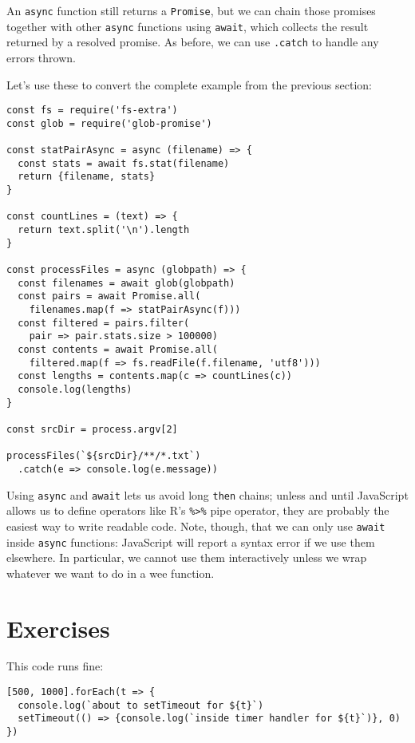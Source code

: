 An \texttt{async} function still returns a \texttt{Promise},
but we can chain those promises together with other \texttt{async} functions using \texttt{await},
which collects the result returned by a resolved promise.
As before, we can use \texttt{.catch} to handle any errors thrown.

Let's use these to convert the complete example from the previous section:

\begin{verbatim}
const fs = require('fs-extra')
const glob = require('glob-promise')

const statPairAsync = async (filename) => {
  const stats = await fs.stat(filename)
  return {filename, stats}
}

const countLines = (text) => {
  return text.split('\n').length
}

const processFiles = async (globpath) => {
  const filenames = await glob(globpath)
  const pairs = await Promise.all(
    filenames.map(f => statPairAsync(f)))
  const filtered = pairs.filter(
    pair => pair.stats.size > 100000)
  const contents = await Promise.all(
    filtered.map(f => fs.readFile(f.filename, 'utf8')))
  const lengths = contents.map(c => countLines(c))
  console.log(lengths)
}

const srcDir = process.argv[2]

processFiles(`${srcDir}/**/*.txt`)
  .catch(e => console.log(e.message))
\end{verbatim}

Using \texttt{async} and \texttt{await} lets us avoid long \texttt{then} chains;
unless and until JavaScript allows us to define operators like R's \texttt{\%\textgreater{}\%} pipe operator,
they are probably the easiest way to write readable code.
Note,
though,
that we can only use \texttt{await} inside \texttt{async} functions:
JavaScript will report a syntax error if we use them elsewhere.
In particular,
we cannot use them interactively unless we wrap whatever we want to do in a wee function.

\section{Exercises}\label{s:promises-exercises}


This code runs fine:

\begin{verbatim}
[500, 1000].forEach(t => {
  console.log(`about to setTimeout for ${t}`)
  setTimeout(() => {console.log(`inside timer handler for ${t}`)}, 0)
})
\end{verbatim}

